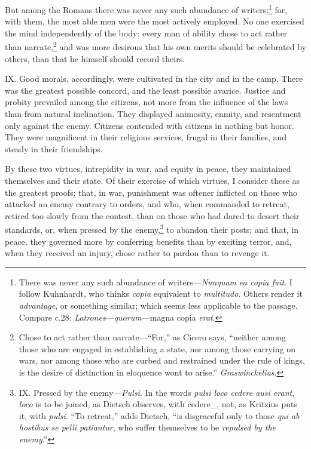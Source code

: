 But among the Romans there was never any such abundance of writers;\footnote{There was never any such abundance of writers—\emph{Nunquam ea
copia fuit}. I follow Kuhnhardt, who thinks \emph{copia} equivalent to
\emph{multitudo}. Others render it \emph{advantage}, or something similar;
which seems less applicable to the passage. Compare c.28:
\emph{Latrones}—\emph{quorum}—magna copia \emph{erat}.}
for, with them, the most able men were the most actively employed. No
one exercised the mind independently of the body: every man of ability
chose to act rather than narrate,\footnote{Chose to act rather than narrate—``For,'' as Cicero says,
``neither among those who are engaged in establishing a state, nor
among those carrying on wars, nor among those who are curbed and
restrained under the rule of kings, is the desire of distinction in
eloquence wont to arise.'' \emph{Graswinckelius}.} and was more desirous that his
own merits should be celebrated by others, than that he himself should
record theirs.

IX. Good morals, accordingly, were cultivated in the city and in the
camp. There was the greatest possible concord, and the least possible
avarice. Justice and probity prevailed among the citizens, not more
from the influence of the laws than from natural inclination. They
displayed animosity, enmity, and resentment only against the enemy.
Citizens contended with citizens in nothing but honor. They were
magnificent in their religious services, frugal in their families,
and steady in their friendships.

By these two virtues, intrepidity in war, and equity in peace, they
maintained themselves and their state. Of their exercise of which
virtues, I consider these as the greatest proofs; that, in war,
punishment was oftener inflicted on those who attacked an enemy
contrary to orders, and who, when commanded to retreat, retired too
slowly from the contest, than on those who had dared to desert their
standards, or, when pressed by the enemy,\footnote{IX. Pressed by the enemy—\emph{Pulsi}. In the words \emph{pulsi loco
cedere ausi erant}, \emph{loco} is to be joined, as Dietsch observes, with
cedere\_, not, as Kritzius puts it, with \emph{pulsi}. ``To retreat,'' adds
Dietsch, ``is disgraceful only to those \emph{qui ab hostibus se pelli
patiantur}, who suffer themselves to be \emph{repulsed by the enemy}.''} to abandon their posts;
and that, in peace, they governed more by conferring benefits than by
exciting terror, and, when they received an injury, chose rather to
pardon than to revenge it.

